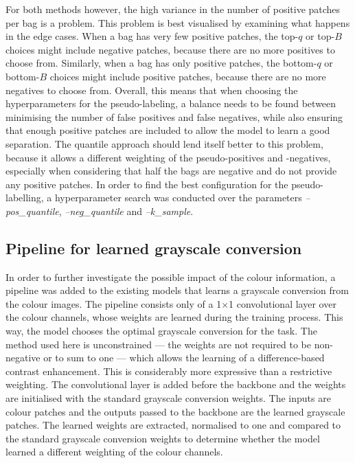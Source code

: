 \documentclass[12pt,parskip = half, DIV=classic,listof=totoc]{scrartcl}
\begin{document}
			For both methods however, the high variance in the number of positive patches per bag is a problem. This problem is best visualised by examining what happens in the 
			edge cases. When a bag has very few positive patches, the top-$q$ or top-$B$ choices might include negative patches, because there are no more positives to 
			choose from. Similarly, when a bag has only positive patches, the bottom-$q$ or bottom-$B$ choices might include positive patches, because there are no more negatives to 
			choose from. Overall, this means that when choosing the hyperparameters for the pseudo-labeling, a balance needs to be found between minimising the number of 
			false positives and false negatives, while also ensuring that enough positive patches are included to allow the model to learn a good separation. The quantile approach
			should lend itself better to this problem, because it allows a different weighting of the pseudo-positives and -negatives, especially when considering
			that half the bags are negative and do not provide any positive patches. In order to find the best configuration for the pseudo-labelling, 
			a hyperparameter search was conducted over the parameters \textit{--pos\_quantile}, \textit{--neg\_quantile} and \textit{--k\_sample}.

		\subsection{Pipeline for learned grayscale conversion}\label{sec:learned_grayscale}
			In order to further investigate the possible impact of the colour information, a pipeline was added to the existing models that learns a grayscale conversion from the colour images.
			The pipeline consists only of a 1$\times$1 convolutional layer over the colour channels, whose weights are learned during the training process. This way, the 
			model chooses the optimal grayscale conversion for the task. The method used here is unconstrained --- the weights are not required to be non-negative or to sum to one --- 
			which allows the learning of a difference-based contrast enhancement. This is considerably more expressive than a restrictive weighting.
			The convolutional layer is added before the backbone and the weights are initialised with the standard grayscale conversion weights. 
			The inputs are colour patches and the outputs passed to the backbone are the learned grayscale patches. The learned weights are extracted, normalised to one 
			and compared to the standard grayscale conversion weights to determine whether the model learned a different weighting of the colour channels.
\end{document}
